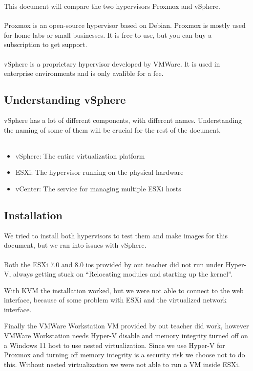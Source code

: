 This document will compare the two hypervisors Proxmox and vSphere.
\\\\
Proxmox is an open-source hypervisor based on Debian. Proxmox is mostly used for home labs or small businesses. It is free to use, but you can buy a subscription to get support.
\\\\
vSphere is a proprietary hypervisor developed by VMWare. It is used in enterprise environments and is only avalible for a fee.

\subsection{Understanding vSphere}

vSphere has a lot of different components, with different names. Understanding the naming of some of them will be crucial for the rest of the document.
\\\\
\begin{itemize}
	\item vSphere: The entire virtualization platform
	\item ESXi: The hypervisor running on the physical hardware
	\item vCenter: The service for managing multiple ESXi hosts
\end{itemize}

\subsection{Installation}

We tried to install both hypervisors to test them and make images for this document, but we ran into issues with vSphere.
\\\\
Both the ESXi 7.0 and 8.0 ios provided by out teacher did not run under Hyper-V, always getting stuck on ``Relocating modules and starting up the kernel''.

With KVM the installation worked, but we were not able to connect to the web interface, because of some problem with ESXi and the virtualized network interface.

Finally the VMWare Workstation VM provided by out teacher did work, however VMWare Workstation needs Hyper-V disable and memory integrity turned off on a Windows 11 host to use nested virtualization. Since we use Hyper-V for Proxmox and turning off memory integrity is a security risk we choose not to do this. Without nested virtualization we were not able to run a VM inside ESXi.